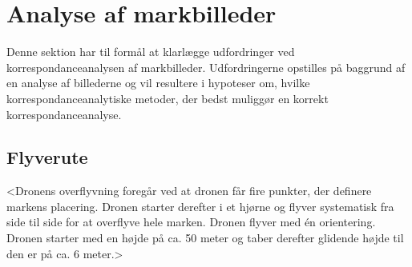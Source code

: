 \chapter{Analyse af markbilleder} \label{sec:mark}
Denne sektion har til formål at klarlægge udfordringer ved korrespondanceanalysen af markbilleder. Udfordringerne opstilles på baggrund af en analyse af billederne og vil resultere i hypoteser om, hvilke korrespondanceanalytiske metoder, der bedst muliggør en korrekt korrespondanceanalyse.
\section{Flyverute}
<Dronens overflyvning foregår ved at dronen får fire punkter, der definere markens placering. Dronen starter derefter i et hjørne og flyver systematisk fra side til side for at overflyve hele marken. Dronen flyver med én orientering. Dronen starter med en højde på ca. 50 meter og taber derefter glidende højde til den er på ca. 6 meter.>
